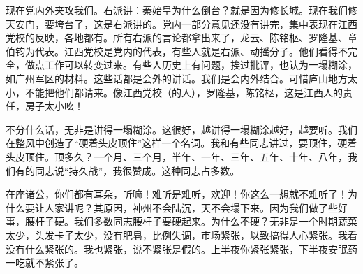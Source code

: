 现在党内外夹攻我们。右派讲：秦始皇为什么倒台？就是因为修长城。现在我们修天安门，要垮台了，这是右派讲的。党内一部分意见还没有讲完，集中表现在江西党校的反映，各地都有。所有右派的言论都拿出来了，龙云、陈铭枢、罗隆基、章伯钧为代表。江西党校是党内的代表，有些人就是右派、动摇分子。他们看得不完全，做点工作可以转变过来。有些人历史上有问题，挨过批评，也认为一塌糊涂，如广州军区的材料。这些话都是会外的讲话。我们是会内外结合。可惜庐山地方太小，不能把他们都请来。像江西党校（的人），罗隆基，陈铭枢，这是江西人的责任，房子太小吆！

不分什么话，无非是讲得一塌糊涂。这很好，越讲得一塌糊涂越好，越要听。我们在整风中创造了“硬着头皮顶住”这样一个名词。我和有些同志讲过，要顶住，硬着头皮顶住。顶多久？一个月、三个月，半年、一年、三年、五年、十年、八年，我们有的同志说“持久战”，我很赞成。这种同志占多数。

在座诸公，你们都有耳朵，听嘛！难听是难听，欢迎！你这么一想就不难听了！为什么要让人家讲呢？其原因，神州不会陆沉，天不会塌下来。因为我们做了些好事，腰杆子硬。我们多数同志腰杆子要硬起来。为什么不硬？无非是一个时期蔬菜太少，头发卡子太少，没有肥皂，比例失调，市场紧张，以致搞得人心紧张。我看没有什么紧张的。我也紧张，说不紧张是假的。上半夜你紧张紧张，下半夜安眠药一吃就不紧张了。

